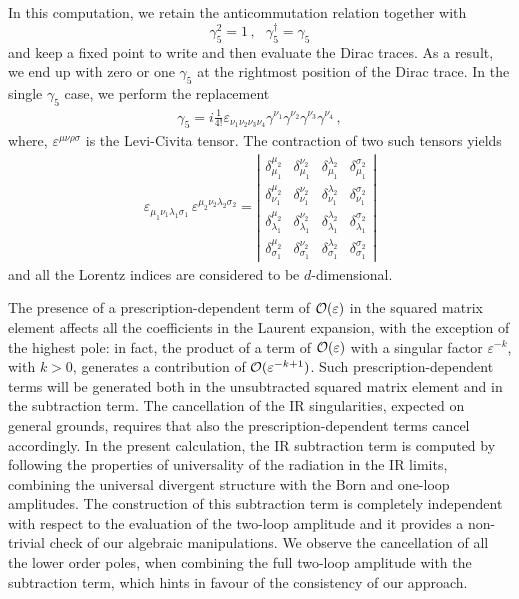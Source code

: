\documentclass[11pt,a4paper]{article}
\begin{document}
In this computation, we retain the anticommutation relation together with
\begin{equation}
 \gamma_5^2 = 1 \,,  ~~~ \gamma_5^{\dag} = \gamma_5
\end{equation}
and keep a fixed point to write and then evaluate the Dirac traces.
As a result, we end up with zero or one $\gamma_5$ at the rightmost position of the Dirac trace.
In the single $\gamma_5$ case, we perform the replacement
%
\begin{align}
  \gamma_5 = i \frac{1}{4!} \varepsilon_{\nu_1 \nu_2 \nu_3 \nu_4}
  \gamma^{\nu_1}  \gamma^{\nu_2} \gamma^{\nu_3} \gamma^{\nu_4} \,,
\end{align}
%
where, $\varepsilon^{\mu\nu\rho\sigma}$ is the Levi-Civita tensor.
The contraction of two such tensors yields
%
\begin{align}
  \label{eqn:LeviContract}
  \varepsilon_{\mu_1\nu_1\lambda_1\sigma_1}\,\varepsilon^{\mu_2\nu_2\lambda_2\sigma_2}=
  {\left |
  \begin{array}{cccc}
    \delta_{\mu_1}^{\mu_2} &\delta_{\mu_1}^{\nu_2}&\delta_{\mu_1}^{\lambda_2} & \delta_{\mu_1}^{\sigma_2}\\
    \delta_{\nu_1}^{\mu_2}&\delta_{\nu_1}^{\nu_2}&\delta_{\nu_1}^{\lambda_2}&\delta_{\nu_1}^{\sigma_2}\\
    \delta_{\lambda_1}^{\mu_2}&\delta_{\lambda_1}^{\nu_2}&\delta_{\lambda_1}^{\lambda_2}&\delta_{\lambda_1}^{\sigma_2}\\
    \delta_{\sigma_1}^{\mu_2}&\delta_{\sigma_1}^{\nu_2}&\delta_{\sigma_1}^{\lambda_2}&\delta_{\sigma_1}^{\sigma_2}
  \end{array}
                                                                                       \right |}
\end{align}
%
and all the Lorentz indices are considered to be $d$-dimensional.



The presence of a prescription-dependent term of ${\cal O}(\varepsilon)$ in the squared matrix element
affects all the coefficients in the Laurent expansion, with the exception of the highest pole:
in fact,
the product of a term of ${\cal O}(\varepsilon)$ with a singular factor $\varepsilon^{-k}$, with $k>0$,
generates a contribution of ${\cal O}(\varepsilon^{-k+1})$.
Such prescription-dependent terms will be generated both in the unsubtracted squared matrix element and in the subtraction term.
The cancellation of the IR singularities,
expected on general grounds,
requires that also the prescription-dependent terms cancel accordingly.
In the present calculation, the IR subtraction term is computed by following the properties of universality of the radiation in the IR limits,
combining the universal divergent structure with the Born and one-loop amplitudes.
The construction of this subtraction term is completely independent with respect to the evaluation of the two-loop amplitude and it
provides a non-trivial check of our algebraic manipulations.
We observe the cancellation of all the lower order poles, when combining the full two-loop amplitude with the subtraction term, which hints in favour of the consistency of our approach.
\end{document}
